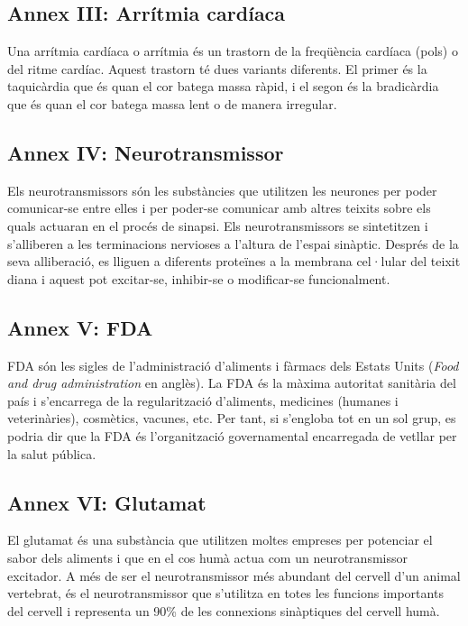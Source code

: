 \documentclass[a4paper,12pt]{article}
\begin{document}
\subsection*{Annex III: Arrítmia cardíaca}
Una arrítmia cardíaca o arrítmia és un trastorn de la freqüència cardíaca (pols) o del ritme cardíac. Aquest trastorn té dues variants diferents. El primer és la taquicàrdia que és quan el cor batega massa ràpid, i el segon és la bradicàrdia que és quan el cor batega massa lent o de manera irregular.
\subsection*{Annex IV: Neurotransmissor}
Els neurotransmissors són les substàncies que utilitzen les neurones per poder comunicar-se entre elles i per poder-se comunicar amb altres teixits sobre els quals actuaran en el procés de sinapsi. Els neurotransmissors se sintetitzen i s'alliberen a les terminacions nervioses a l'altura de l'espai sinàptic. Després de la seva alliberació, es lliguen a diferents proteïnes a la membrana cel·lular del teixit diana i aquest pot excitar-se, inhibir-se o modificar-se funcionalment.
\subsection*{Annex V: FDA}
FDA són les sigles de l'administració d'aliments i fàrmacs dels Estats Units (\textit{Food and drug administration} en anglès). La FDA és la màxima autoritat sanitària del país i s'encarrega de la regularització d'aliments, medicines (humanes i veterinàries), cosmètics, vacunes, etc. Per tant, si s'engloba tot en un sol grup, es podria dir que la FDA és l'organització governamental encarregada de vetllar per la salut pública.
\subsection*{Annex VI: Glutamat}
El glutamat és una substància que utilitzen moltes empreses per potenciar el sabor dels aliments i que en el cos humà actua com un neurotransmissor excitador. A més de ser el neurotransmissor més abundant del cervell d'un animal vertebrat, és el neurotransmissor que s'utilitza en totes les funcions importants del cervell i representa un 90\% de les connexions sinàptiques del cervell humà.
\end{document}
